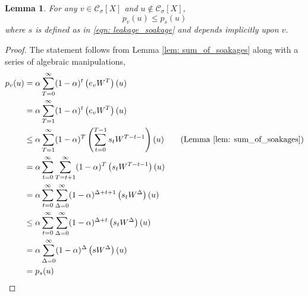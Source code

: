 \documentclass[11pt,twoside]{article}
\newtheorem{lemma}{Lemma}
\newcommand{\1}{\mathbf{1}}
\newcommand{\pbf}{p}        %
\newcommand{\Xbf}{X}             %
\newcommand{\Wbf}{W}
\newcommand{\Cset}{\mathcal{C}}
\newcommand{\Csig}{\Cset_{\sigma}}
\begin{document}
\begin{lemma}
	\label{lem: soakage_ppr_lb}
	For any $v \in \Csig[\Xbf]$ and $u \not\in \Csig[\Xbf]$,
	\begin{equation*}
	\pbf_{v}(u) \leq \pbf_{s}(u)
	\end{equation*}
	where $s$ is defined as in \eqref{eqn: leakage_soakage} and depends implicitly upon $v$.
\end{lemma}
\begin{proof}
	The statement follows from Lemma \ref{lem: sum_of_soakages} along with a series of algebraic manipulations,
	\begin{align*}
	\pbf_v(u) & = \alpha\sum_{T = 0}^{\infty} (1 - \alpha)^t \left(e_v \Wbf^T\right)(u) \\
	& = \alpha\sum_{T = 1}^{\infty} (1 - \alpha)^t \left(e_v \Wbf^T\right)(u) \\
	& \leq \alpha \sum_{T=1}^{\infty} (1 - \alpha)^T \left( \sum_{t = 0}^{T - 1} s_t \Wbf^{T - t - 1} \right)(u) \tag{Lemma \ref{lem: sum_of_soakages}}\\
	& = \alpha \sum_{t=0}^{\infty} \sum_{T = t + 1}^{\infty} (1 - \alpha)^T \left( s_t \Wbf^{T - t - 1} \right)(u)\\
	& = \alpha \sum_{t=0}^{\infty} \sum_{\Delta = 0}^{\infty} (1 - \alpha)^{\Delta + t + 1} \left( s_t \Wbf^{\Delta} \right)(u) \\
	& \leq \alpha \sum_{t=0}^{\infty} \sum_{\Delta = 0}^{\infty} (1 - \alpha)^{\Delta + t } \left( s_t \Wbf^{\Delta} \right)(u) \\
	& = \alpha \sum_{\Delta = 0}^{\infty} (1 - \alpha)^{\Delta} \left(s \Wbf^{\Delta}\right)(u) \\
	& = \pbf_s(u)
	\end{align*}
\end{proof}
\end{document}
